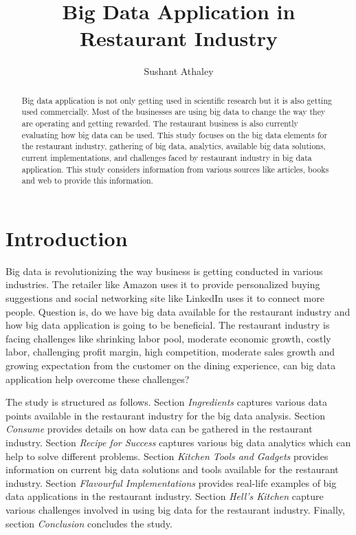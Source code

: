 \documentclass[sigconf]{acmart}
\begin{document}
\title{Big Data Application in Restaurant Industry}


\author{Sushant Athaley}



\begin{abstract}
Big data application is not only getting used in scientific research but it is also getting used commercially. Most of the businesses are using big data to change the way they are operating and getting rewarded. The restaurant business is also currently evaluating how big data can be used. This study focuses on the big data elements for the restaurant industry, gathering of big data, analytics, available big data solutions, current implementations, and challenges faced by restaurant industry in big data application. This study considers information from various sources like articles, books and web to provide this information.
\end{abstract}



\maketitle

\section{Introduction}
Big data is revolutionizing the way business is getting conducted in various industries. The retailer like Amazon uses it to provide personalized buying suggestions and social networking site like LinkedIn uses it to connect more people. Question is, do we have big data available for the restaurant industry and how big data application is going to be beneficial. The restaurant industry is facing challenges like shrinking labor pool, moderate economic growth, costly labor, challenging profit margin, high competition, moderate sales growth and growing expectation from the customer on the dining experience, can big data application help overcome these challenges?\cite{www-restaurant-challenges}

The study is structured as follows. Section {\em Ingredients} captures various data points available in the restaurant industry for the big data analysis. Section {\em Consume} provides details on how data can be gathered in the restaurant industry. Section {\em Recipe for Success} captures various big data analytics which can help to solve different problems. Section {\em Kitchen Tools and Gadgets} provides information on current big data solutions and tools available for the restaurant industry. Section {\em Flavourful Implementations} provides real-life examples of big data applications in the restaurant industry. Section {\em Hell's Kitchen} capture various challenges involved in using big data for the restaurant industry. Finally, section {\em Conclusion} concludes the study.
\end{document}
